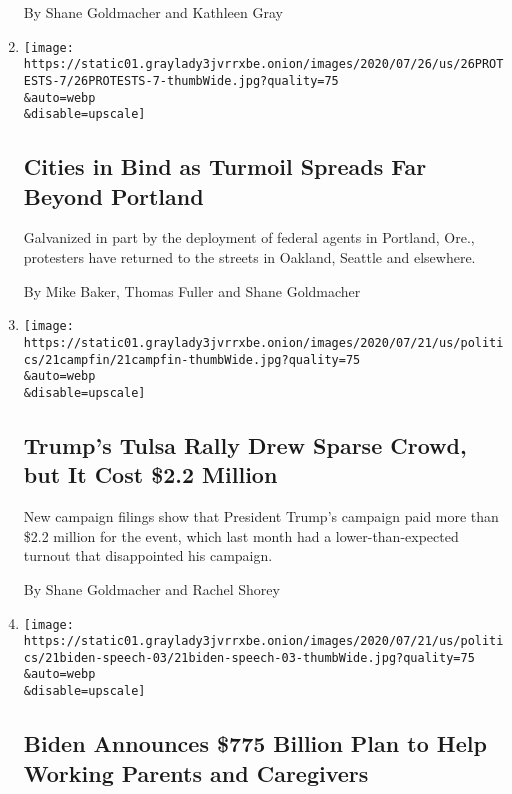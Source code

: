 \begin{enumerate}
  By Shane Goldmacher and Kathleen Gray
\item
  \href{/2020/07/26/us/protests-portland-seattle-trump.html}{}

  \texttt{[image: https://static01.graylady3jvrrxbe.onion/images/2020/07/26/us/26PROTESTS-7/26PROTESTS-7-thumbWide.jpg?quality=75\\\&auto=webp\\\&disable=upscale]}

  \hypertarget{cities-in-bind-as-turmoil-spreads-far-beyond-portland}{%
  \subsection{Cities in Bind as Turmoil Spreads Far Beyond
  Portland}\label{cities-in-bind-as-turmoil-spreads-far-beyond-portland}}

  Galvanized in part by the deployment of federal agents in Portland,
  Ore., protesters have returned to the streets in Oakland, Seattle and
  elsewhere.

  By Mike Baker, Thomas Fuller and Shane Goldmacher
\item
  \href{/2020/07/21/us/politics/trump-tulsa-rally-cost.html}{}

  \texttt{[image: https://static01.graylady3jvrrxbe.onion/images/2020/07/21/us/politics/21campfin/21campfin-thumbWide.jpg?quality=75\\\&auto=webp\\\&disable=upscale]}

  \hypertarget{trumps-tulsa-rally-drew-sparse-crowd-but-it-cost-22-million}{%
  \subsection{Trump's Tulsa Rally Drew Sparse Crowd, but It Cost \$2.2
  Million}\label{trumps-tulsa-rally-drew-sparse-crowd-but-it-cost-22-million}}

  New campaign filings show that President Trump's campaign paid more
  than \$2.2 million for the event, which last month had a
  lower-than-expected turnout that disappointed his campaign.

  By Shane Goldmacher and Rachel Shorey
\item
  \href{/2020/07/21/us/politics/biden-workplace-childcare.html}{}

  \texttt{[image: https://static01.graylady3jvrrxbe.onion/images/2020/07/21/us/politics/21biden-speech-03/21biden-speech-03-thumbWide.jpg?quality=75\\\&auto=webp\\\&disable=upscale]}

  \hypertarget{biden-announces-775-billion-plan-to-help-working-parents-and-caregivers}{%
  \subsection{Biden Announces \$775 Billion Plan to Help Working Parents
  and
  Caregivers}\label{biden-announces-775-billion-plan-to-help-working-parents-and-caregivers}}


\end{enumerate}

